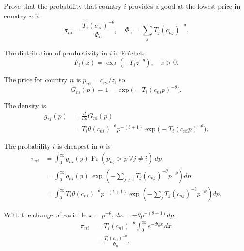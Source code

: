 \begin{question}
Prove that the probability that country $i$ provides a good at the lowest price in country $n$ is
\[
\pi_{ni} = \frac{T_i (c_{ni})^{-\theta}}{\Phi_n}, \quad
\Phi_n = \sum_j T_j (c_{nj})^{-\theta}.
\]
\end{question}

\begin{solution}
The distribution of productivity in $i$ is Fréchet:
\[
F_i(z) = \exp(-T_i z^{-\theta}), \quad z > 0.
\]

The price for country $n$ is $p_{ni} = c_{ni}/z$, so
\[
G_{ni}(p) = 1 - \exp\!\big(-T_i (c_{ni} p)^{-\theta}\big).
\]

The density is
\begin{align*}
g_{ni}(p) 
&= \frac{d}{dp} G_{ni}(p) \\
&= T_i \theta (c_{ni})^{-\theta} p^{-(\theta+1)} 
    \exp\!\big(-T_i (c_{ni} p)^{-\theta}\big).
\end{align*}

The probability $i$ is cheapest in $n$ is
\begin{align*}
\pi_{ni} &= \int_0^\infty g_{ni}(p) 
    \Pr(p_{nj} > p \ \forall j \neq i)\, dp \\
&= \int_0^\infty g_{ni}(p)\,
    \exp\!\left(-\sum_{j \neq i} T_j (c_{nj})^{-\theta} p^{-\theta}\right) dp \\
&= \int_0^\infty T_i \theta (c_{ni})^{-\theta} p^{-(\theta+1)} 
    \exp\!\left(-\sum_{j} T_j (c_{nj})^{-\theta} p^{-\theta}\right) dp.
\end{align*}

With the change of variable $x = p^{-\theta}$, $dx = -\theta p^{-(\theta+1)} dp$,
\begin{align*}
\pi_{ni} &= T_i (c_{ni})^{-\theta} 
    \int_0^\infty e^{-\Phi_n x} \, dx \\
&= \frac{T_i (c_{ni})^{-\theta}}{\Phi_n}.
\end{align*}
\end{solution}

